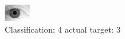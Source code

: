 \begin{figure}[h!]
\begin{center}
\includegraphics[width=0.60\columnwidth]{figures/ID2162_class_4_target_3.png}
\end{center}
\caption{ Classification: 4 actual target: 3}
\label{fig:ID2162_class_4_target_3}
\end{figure}
